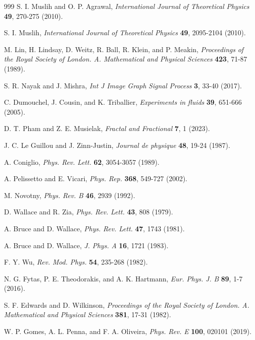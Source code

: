 \documentclass[pre,aps,twocolumn,showpacs,floatfix,nofootinbib,superscriptaddress,linenumbers]{revtex4-1}
\begin{document}
\begin{thebibliography}{999}
 S. I. Muslih and O. P. Agrawal, \textit{International Journal of Theoretical Physics} \textbf{49}, 270-275 (2010).

 S. I. Muslih, \textit{International Journal of Theoretical Physics} \textbf{49}, 2095-2104 (2010).

 M. Lin, H. Lindsay, D. Weitz, R. Ball, R. Klein, and P. Meakin, \textit{Proceedings of the Royal Society of London. A. Mathematical and Physical Sciences} \textbf{423}, 71-87 (1989).

 S. R. Nayak and J. Mishra, \textit{Int J Image Graph Signal Process} \textbf{3}, 33-40 (2017).

 C. Dumouchel, J. Cousin, and K. Triballier, \textit{Experiments in fluids} \textbf{39}, 651-666 (2005).

 D. T. Pham and Z. E. Musielak, \textit{Fractal and Fractional} \textbf{7}, 1 (2023).

 J. C. Le Guillou and J. Zinn-Justin, \textit{Journal de physique} \textbf{48}, 19-24 (1987).

 A. Coniglio, \textit{Phys. Rev. Lett.} \textbf{62}, 3054-3057 (1989).

 A. Pelissetto and E. Vicari, \textit{Phys. Rep.} \textbf{368}, 549-727 (2002).

 M. Novotny, \textit{Phys. Rev. B} \textbf{46}, 2939 (1992).

 D. Wallace and R. Zia, \textit{Phys. Rev. Lett.} \textbf{43}, 808 (1979).

 A. Bruce and D. Wallace, \textit{Phys. Rev. Lett.} \textbf{47}, 1743 (1981).

 A. Bruce and D. Wallace, \textit{J. Phys. A} \textbf{16}, 1721 (1983).


 F. Y. Wu, \textit{Rev. Mod. Phys.} \textbf{54}, 235-268 (1982).

 N. G. Fytas, P. E. Theodorakis, and A. K. Hartmann, \textit{Eur. Phys. J. B} \textbf{89}, 1-7 (2016).

 S. F. Edwards and D. Wilkinson, \textit{Proceedings of the Royal Society of London. A. Mathematical and Physical Sciences} \textbf{381}, 17-31 (1982).

 W. P. Gomes, A. L. Penna, and F. A. Oliveira, \textit{Phys. Rev. E} \textbf{100}, 020101 (2019).


\end{thebibliography}
\end{document}
